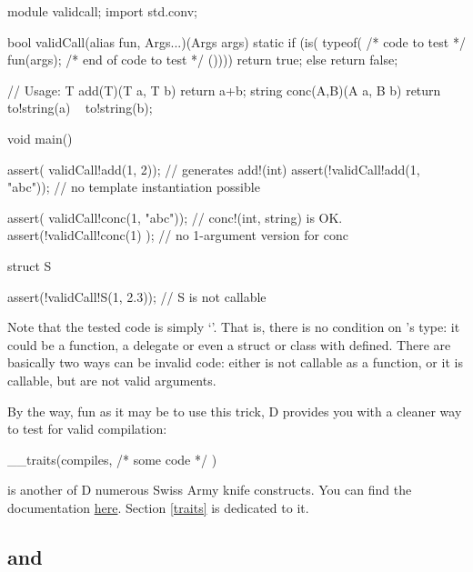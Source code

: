 \begin{dcode}
module validcall;
import std.conv;

bool validCall(alias fun, Args...)(Args args) 
{
    static if (is( typeof({ /* code to test */
                            fun(args);
                            /* end of code to test */
                          }())))
        return true;
    else
        return false;
}

// Usage:
T add(T)(T a, T b) { return a+b;}
string conc(A,B)(A a, B b) { return to!string(a) ~ to!string(b);}

void main()
{
    assert( validCall!add(1, 2));   // generates add!(int)
    assert(!validCall!add(1, "abc")); // no template instantiation possible

    assert( validCall!conc(1, "abc")); // conc!(int, string) is OK.
    assert(!validCall!conc(1)       ); // no 1-argument version for conc

    struct S {}
  
    assert(!validCall!S(1, 2.3)); // S is not callable
}
\end{dcode}

Note that the tested code is simply `'. That is, there is no condition on 's type: it could be a function, a delegate or even a struct or class with  defined. There are basically two ways  can be invalid code: either  is not callable as a function, or it is callable, but  are not valid arguments.

By the way, fun as it may be to use this trick, D provides you with a cleaner way to test for valid compilation:

\begin{dcode}
__traits(compiles, { /* some code */ })
\end{dcode}

 is another of D numerous Swiss Army knife constructs. You can find the  documentation \href{http://www.dlang.org/traits.html#compiles}{here}. Section \ref{traits} is dedicated to it.

\subsection{
\texorpdfstring{ and }
               {is(Type : AnotherType) and is(Type == AnotherType)}}
\label{istypeanothertype}

